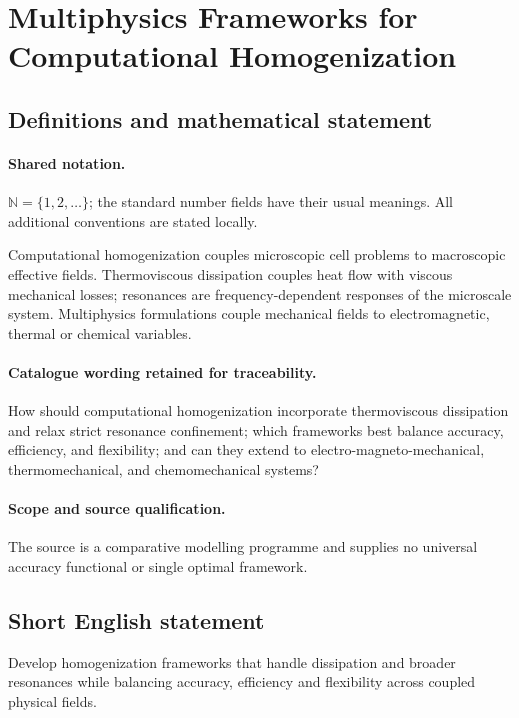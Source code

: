 \documentclass[11pt]{article}
\begin{document}
\section{Multiphysics Frameworks for Computational Homogenization}\label{statement}

\subsection{Definitions and mathematical statement}

\paragraph{Shared notation.}$\mathbb N=\{1,2,\ldots\}$; the standard number fields have their usual meanings. All additional conventions are stated locally.


Computational homogenization couples microscopic cell problems to macroscopic effective fields. Thermoviscous dissipation couples heat flow with viscous mechanical losses; resonances are frequency-dependent responses of the microscale system. Multiphysics formulations couple mechanical fields to electromagnetic, thermal or chemical variables.

\paragraph{Catalogue wording retained for traceability.}
How should computational homogenization incorporate thermoviscous dissipation and relax strict resonance confinement; which frameworks best balance accuracy, efficiency, and flexibility; and can they extend to electro-magneto-mechanical, thermomechanical, and chemomechanical systems?

\paragraph{Scope and source qualification.}The source is a comparative modelling programme and supplies no universal accuracy functional or single optimal framework.
\subsection{Short English statement}
Develop homogenization frameworks that handle dissipation and broader resonances while balancing accuracy, efficiency and flexibility across coupled physical fields.
\end{document}
